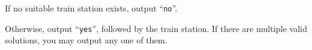 
	If no suitable train station exists, output ``\texttt{no}''.

	Otherwise, output ``\texttt{yes}'', followed by the train station.
	If there are multiple valid solutions, you may output any one of them.
